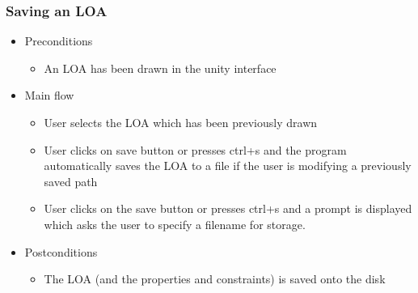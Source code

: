 \subsubsection{Saving an LOA}
    \begin{itemize}
    \item Preconditions
        \begin{itemize}
            \item An LOA has been drawn in the unity interface
        \end{itemize}
    \end{itemize}
    \begin{itemize}
        \item Main flow
        \begin{itemize}
            \item User selects the LOA which has been previously drawn
            \item User clicks on save button or presses ctrl+s and the program automatically saves the LOA to a file if the user is modifying a previously saved path
            \item User clicks on the save button or presses ctrl+s and a prompt is displayed which asks the user to specify a filename for storage.
        \end{itemize}
    \end{itemize}
    \begin{itemize}
        \item Postconditions
        \begin{itemize}
            \item The LOA (and the properties and constraints) is saved onto the disk
        \end{itemize}
    \end{itemize}

